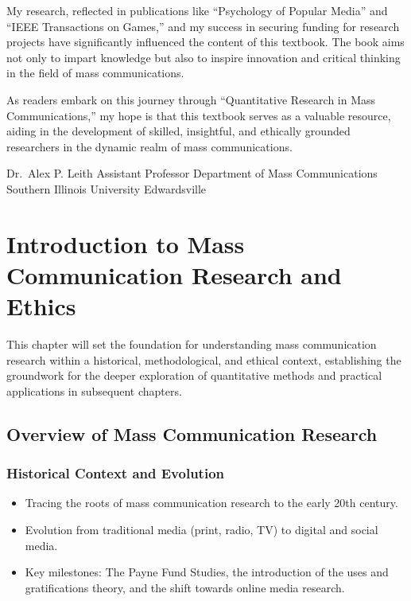 \documentclass[
]{book}
\begin{document}
My research, reflected in publications like ``Psychology of Popular Media'' and ``IEEE Transactions on Games,'' and my success in securing funding for research projects have significantly influenced the content of this textbook. The book aims not only to impart knowledge but also to inspire innovation and critical thinking in the field of mass communications.

As readers embark on this journey through ``Quantitative Research in Mass Communications,'' my hope is that this textbook serves as a valuable resource, aiding in the development of skilled, insightful, and ethically grounded researchers in the dynamic realm of mass communications.

Dr.~Alex P. Leith
Assistant Professor
Department of Mass Communications
Southern Illinois University Edwardsville

\hypertarget{introduction-to-mass-communication-research-and-ethics}{%
\chapter{Introduction to Mass Communication Research and Ethics}\label{introduction-to-mass-communication-research-and-ethics}}

This chapter will set the foundation for understanding mass communication research within a historical, methodological, and ethical context, establishing the groundwork for the deeper exploration of quantitative methods and practical applications in subsequent chapters.

\hypertarget{overview-of-mass-communication-research}{%
\section*{Overview of Mass Communication Research}\label{overview-of-mass-communication-research}}

\hypertarget{historical-context-and-evolution}{%
\subsection*{Historical Context and Evolution}\label{historical-context-and-evolution}}

\begin{itemize}
\item
  Tracing the roots of mass communication research to the early 20th century.
\item
  Evolution from traditional media (print, radio, TV) to digital and social media.
\item
  Key milestones: The Payne Fund Studies, the introduction of the uses and gratifications theory, and the shift towards online media research.
\end{itemize}
\end{document}
